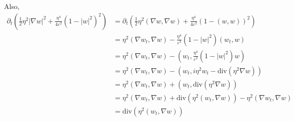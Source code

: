 \documentclass[a4paper]{article}
\renewcommand{\div}{\mathrm{div}}
\begin{document}
Also,
\begin{align} \label{eqn:?}
  \partial_t \left( \frac{1}{2} \eta^2 | \nabla w |^2 + \frac{\eta^4}{4 \varepsilon^2} (1-|w|^2)^2 \right) &= \partial_t \left( \frac{1}{2} \eta^2
  (\nabla w, \nabla w) + \frac{\eta^4}{4 \varepsilon^2} ( 1 - (w,w))^2 \right) \nonumber \\
  &= \eta^2 (\nabla w_t, \nabla w) - \frac{\eta^4}{ \varepsilon^2} (1 - |w|^2) (w_t,w) \nonumber \\
  &= \eta^2 (\nabla w_t, \nabla w) - \left( w_t, \frac{\eta^4}{\varepsilon^2} (1 - |w|^2)w \right) \nonumber \\
  &= \eta^2 (\nabla w_t, \nabla w) - (w_t, i \eta^2 w_t - \div(\eta^2 \nabla w) ) \nonumber \\
  &= \eta^2 (\nabla w_t, \nabla w) + (w_t, \div(\eta^2 \nabla w)) \nonumber \\
  &= \eta^2 (\nabla w_t, \nabla w) + \div (\eta^2 (w_t, \nabla w)) - \eta^2 (\nabla w_t, \nabla w) \nonumber \\
  &= \div( \eta^2 ( w_t, \nabla w) )
\end{align}
\end{document}
